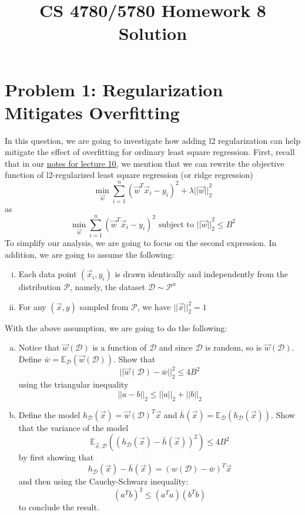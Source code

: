 \documentclass{article}
\title{CS 4780/5780 Homework 8 Solution}
\author{}
\date{}
\begin{document}
    \maketitle
    \section*{Problem 1: Regularization Mitigates Overfitting}
    In this question, we are going to investigate how adding l2 regularization
    can help mitigate the effect of overfitting for ordinary least square regression.
    First, recall that in our \href{http://www.cs.cornell.edu/courses/cs4780/2018sp/lectures/lecturenote10.html}{notes for lecture 10}, we mention that we can rewrite the objective
    function of l2-regularized least square regression (or ridge regression)
    $$\min_{\vec{w}} \sum_{i=1}^n (\vec{w}^T \vec{x}_i - y_i) ^ 2 + \lambda {||\vec{w}||}_2^2$$ as
    $$\min_{\vec{w}} \sum_{i=1}^n (\vec{w}^T \vec{x}_i - y_i) ^ 2  \text{ subject to } {||\vec{w}||}_2^2 \leq B^2$$
    To simplify our analysis, we are going to focus on the second expression.
    In addition, we are going to assume the following:
    \begin{enumerate}[(i)]
        \item Each data point $(\vec{x}_i, y_i)$ is drawn identically and independently from the distribution $\mathcal{P}$, namely, the dataset $\mathcal{D} \sim \mathcal{P}^n$
        \item For any $(\vec{x},y)$ sampled from $\mathcal{P}$, we have $||\vec{x}||_2^2 =  1$
    \end{enumerate}
    With the above assumption, we are going to do the following:
    \begin{enumerate}[(a)]
        \item Notice that $\vec{w}(\mathcal{D})$ is a function of $\mathcal{D}$ and since $\mathcal{D}$ is random, so is $\vec{w}(\mathcal{D})$. Define $\bar{w} = \mathbb{E}_{\mathcal{D}}(\vec{w}(\mathcal{D}))$. Show that
        $$||\vec{w}(\mathcal{D}) - \bar{w} ||_2^2 \leq 4B^2 $$
        using the triangular inequality
        $$||a-b||_2 \leq ||a||_2 + ||b||_2$$
         \item Define the model $h_\mathcal{D}(\vec{x}) = \vec{w}(\mathcal{D}) ^T \vec{x}$ and $\bar{h}(\vec{x}) = \mathbb{E}_{\mathcal{D}} (h_\mathcal{D}(\vec{x}))$. Show that the variance of the model
        $$\mathbb{E}_{\vec{x}, \mathcal{D}}((h_\mathcal{D}(\vec{x}) - \bar{h}(\vec{x})) ^ 2) \leq 4B^2$$ by first showing that $$h_\mathcal{D}(\vec{x}) - \bar{h}(\vec{x}) = (w(\mathcal{D}) - \bar{w}) ^T \vec{x}$$ and then using the Cauchy-Schwarz inequality: $$(a^Tb)^2 \leq (a^Ta )(b^Tb)$$ to conclude the result.
    \end{enumerate}
\end{document}
